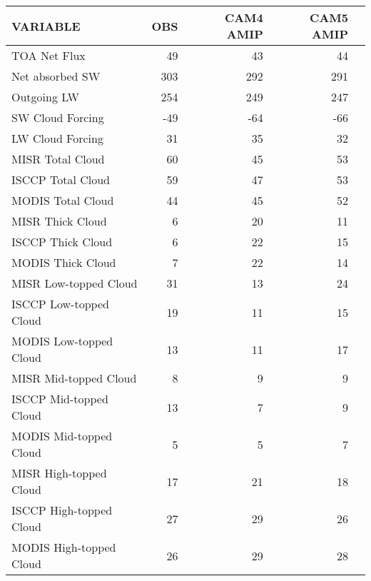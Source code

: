 \begin{tabular}{lrrrr}
\hline
                VARIABLE &                      OBS &                CAM4 AMIP &                CAM5 AMIP \\ \hline
            TOA Net Flux &                       49 &                       43 &                       44 \\
         Net absorbed SW &                      303 &                      292 &                      291 \\
             Outgoing LW &                      254 &                      249 &                      247 \\
        SW Cloud Forcing &                      -49 &                      -64 &                      -66 \\
        LW Cloud Forcing &                       31 &                       35 &                       32 \\
        MISR Total Cloud &                       60 &                       45 &                       53 \\
       ISCCP Total Cloud &                       59 &                       47 &                       53 \\
       MODIS Total Cloud &                       44 &                       45 &                       52 \\
        MISR Thick Cloud &                        6 &                       20 &                       11 \\
       ISCCP Thick Cloud &                        6 &                       22 &                       15 \\
       MODIS Thick Cloud &                        7 &                       22 &                       14 \\
   MISR Low-topped Cloud &                       31 &                       13 &                       24 \\
  ISCCP Low-topped Cloud &                       19 &                       11 &                       15 \\
  MODIS Low-topped Cloud &                       13 &                       11 &                       17 \\
   MISR Mid-topped Cloud &                        8 &                        9 &                        9 \\
  ISCCP Mid-topped Cloud &                       13 &                        7 &                        9 \\
  MODIS Mid-topped Cloud &                        5 &                        5 &                        7 \\
  MISR High-topped Cloud &                       17 &                       21 &                       18 \\
 ISCCP High-topped Cloud &                       27 &                       29 &                       26 \\
 MODIS High-topped Cloud &                       26 &                       29 &                       28 \\ \hline
\end{tabular}
